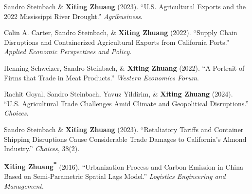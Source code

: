 \documentclass[10.5pt,letterpaper]{article}
\newcommand{\corrauthor}{\textsuperscript{*}}
\renewenvironment{itemize}{
	\begin{list}{}{
			\setlength{\leftmargin}{1.5em}
		}
	}{
	\end{list}
}
\begin{document}
\begin{itemize}
		\item[-] Sandro Steinbach \& \textbf{Xiting Zhuang} (2023).  
		``U.S. Agricultural Exports and the 2022 Mississippi River Drought.''  
		\textit{Agribusiness}.
		
		\item[-] Colin A. Carter, Sandro Steinbach, \& \textbf{Xiting Zhuang} (2022).  
		``Supply Chain Disruptions and Containerized Agricultural Exports from California Ports.''  
		\textit{Applied Economic Perspectives and Policy}.
		
		\item[-] Henning Schweizer, Sandro Steinbach, \& \textbf{Xiting Zhuang} (2022).  
		``A Portrait of Firms that Trade in Meat Products.''  
		\textit{Western Economics Forum}.
		
		\item[-] Rachit Goyal, Sandro Steinbach, Yavuz Yildirim, \& \textbf{Xiting Zhuang} (2024).  
		``U.S. Agricultural Trade Challenges Amid Climate and Geopolitical Disruptions.''  
		\textit{Choices}.
		
		\item[-] Sandro Steinbach \& \textbf{Xiting Zhuang} (2023).  
		``Retaliatory Tariffs and Container Shipping Disruptions Cause Considerable Trade Damages to California’s Almond Industry.''  
		\textit{Choices}, 38(2).
		
		\item[-] \textbf{Xiting Zhuang\corrauthor} (2016).  
		``Urbanization Process and Carbon Emission in China Based on Semi-Parametric Spatial Lags Model.''  
		\textit{Logistics Engineering and Management}.
	\end{itemize}
	
	
	
	
	
\end{document}
